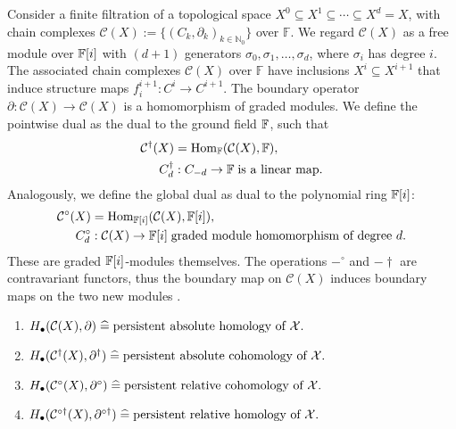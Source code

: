 Consider a finite filtration of a topological space $X^0 \subseteq X^1 \subseteq \cdots \subseteq X^d = X$, with chain complexes \( \mathcal{C}(X) := \{(C_k, \partial_k)_{k \in \mathbb{N}_0} \}\) over \( \mathbb{F} \). We regard $\mathcal{C}(X)$ as a free module over ${\mathbb{F}}[i]$ with $(d+1)$ generators $\sigma_0, \sigma_1, \ldots, \sigma_d$, where $\sigma_i$ has degree $i$. The associated chain complexes \( \mathcal{C}(X) \) over \( \mathbb{F} \) have inclusions \( X^i \subseteq X^{i+1} \) that induce structure maps \( f_{i}^{i+1}: C^i \to C^{i+1} \). The boundary operator $\partial: \mathcal{C}(X) \rightarrow \mathcal{C}(X)$ is a homomorphism of graded modules. We define the pointwise dual as the dual to the ground field ${\mathbb{F}}$, such that
\begin{align}
\mathcal{C}^\dagger(X) &= {\mathrm{Hom}}_{\mathbb{F}}(\mathcal{C}(X),{\mathbb{F}}), \\
C^{\dagger}_d&: C_{-d} \rightarrow {\mathbb{F}} \; \text{is a linear map.}
\end{align}
Analogously, we define the global dual as dual to the polynomial ring ${\mathbb{F}}[i]$:
\begin{align}
\mathcal{C}^\circ(X) &= {\mathrm{Hom}}_{{\mathbb{F}}[i]}(\mathcal{C}(X),{\mathbb{F}}[i]), \\
C^{\circ}_d&: \mathcal{C}(X) \rightarrow {\mathbb{F}}[i] \; \text{graded module homomorphism of degree $d$.}
\end{align}
These are graded ${\mathbb{F}}[i]$-modules themselves. The operations $-^\circ$ and $-\dagger$ are contravariant functors, thus the boundary map on $\mathcal{C}(X)$ induces boundary maps on the two new modules \cite[\S 2.8]{de2011dualities}.

\begin{theorem}\noindent
\begin{enumerate}
\item \(H_\bullet(\mathcal{C}(X), \partial) \; \widehat{=} \; \text{persistent absolute homology\index{homology} of } \mathcal{X}.\)
\item \(H_\bullet(\mathcal{C}^\dagger(X), \partial^\dagger) \; \widehat{=} \; \text{persistent absolute cohomology\index{cohomology} of } \mathcal{X}.\)
\item \(H_\bullet(\mathcal{C}^\circ(X), \partial^\circ) \; \widehat{=} \; \text{persistent relative cohomology\index{cohomology} of } \mathcal{X}.\)
\item \(H_\bullet(\mathcal{C}^{\circ\dagger}(X), \partial^{\circ\dagger}) \; \widehat{=} \; \text{persistent relative homology\index{homology} of } \mathcal{X}.\)
\end{enumerate}
\end{theorem}

